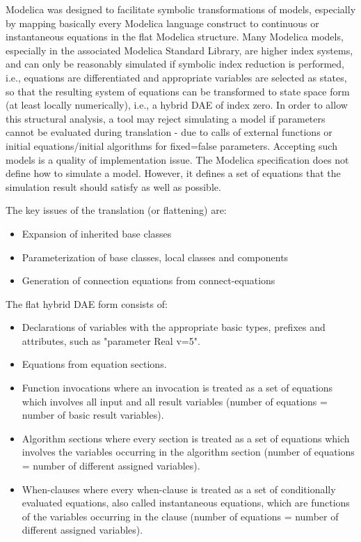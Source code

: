 \documentclass[10pt,a4paper]{report}
\begin{document}
Modelica was designed to facilitate symbolic transformations of models,
especially by mapping basically every Modelica language construct to
continuous or instantaneous equations in the flat Modelica structure.
Many Modelica models, especially in the associated Modelica Standard
Library, are higher index systems, and can only be reasonably simulated
if symbolic index reduction is performed, i.e., equations are
differentiated and appropriate variables are selected as states, so that
the resulting system of equations can be transformed to state space form
(at least locally numerically), i.e., a hybrid DAE of index zero. In
order to allow this structural analysis, a tool may reject simulating a
model if parameters cannot be evaluated during translation - due to
calls of external functions or initial equations/initial algorithms for
fixed=false parameters. Accepting such models is a quality of
implementation issue. The Modelica specification does not define how to
simulate a model. However, it defines a set of equations that the
simulation result should satisfy as well as possible.

The key issues of the translation (or flattening) are:

\begin{itemize}
\item
  Expansion of inherited base classes
\item
  Parameterization of base classes, local classes and components
\item
  Generation of connection equations from connect-equations
\end{itemize}

The flat hybrid DAE form consists of:

\begin{itemize}
\item
  Declarations of variables with the appropriate basic types, prefixes
  and attributes, such as "parameter Real v=5".
\item
  Equations from equation sections.
\item
  Function invocations where an invocation is treated as a set of
  equations which involves all input and all result variables (number of
  equations = number of basic result variables).
\item
  Algorithm sections where every section is treated as a set of
  equations which involves the variables occurring in the algorithm
  section (number of equations = number of different assigned
  variables).
\item
  When-clauses where every when-clause is treated as a set of
  conditionally evaluated equations, also called instantaneous
  equations, which are functions of the variables occurring in the
  clause (number of equations = number of different assigned variables).
\end{itemize}
\end{document}
